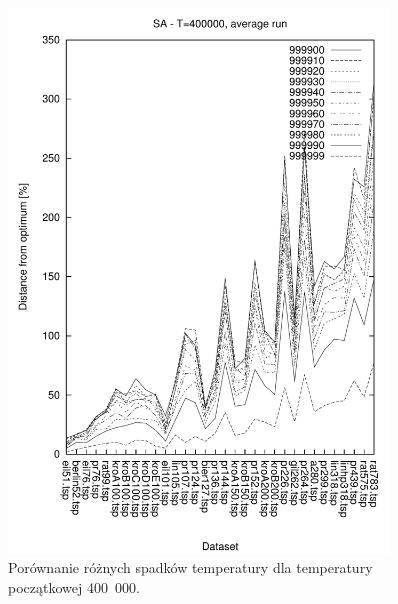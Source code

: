 \begin{figure}
\begin{center}
\includegraphics[width=0.9\textwidth]{wykresy/sa/sa_400000_av}
\end{center}
\caption{Porównanie różnych spadków temperatury dla temperatury początkowej 400~000.}
\label{sa_400000_av}
\end{figure}


